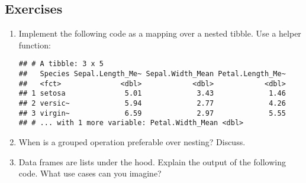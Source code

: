 \documentclass[]{book}
\newenvironment{Shaded}{\begin{snugshade}}{\end{snugshade}}
\newcommand{\ControlFlowTok}[1]{\textcolor[rgb]{0.13,0.29,0.53}{\textbf{#1}}}
\newcommand{\DataTypeTok}[1]{\textcolor[rgb]{0.13,0.29,0.53}{#1}}
\newcommand{\KeywordTok}[1]{\textcolor[rgb]{0.13,0.29,0.53}{\textbf{#1}}}
\newcommand{\NormalTok}[1]{#1}
\newcommand{\OperatorTok}[1]{\textcolor[rgb]{0.81,0.36,0.00}{\textbf{#1}}}
\newcommand{\StringTok}[1]{\textcolor[rgb]{0.31,0.60,0.02}{#1}}
\begin{document}
\hypertarget{exercises-15}{%
\subsection{Exercises}\label{exercises-15}}

\begin{enumerate}
\def\labelenumi{\arabic{enumi}.}
\item
  Implement the following code as a mapping over a nested tibble. Use a helper function:

\begin{Shaded}
\end{Shaded}

\begin{verbatim}
## # A tibble: 3 x 5
##   Species Sepal.Length_Me~ Sepal.Width_Mean Petal.Length_Me~
##   <fct>              <dbl>            <dbl>            <dbl>
## 1 setosa              5.01             3.43             1.46
## 2 versic~             5.94             2.77             4.26
## 3 virgin~             6.59             2.97             5.55
## # ... with 1 more variable: Petal.Width_Mean <dbl>
\end{verbatim}

\begin{Shaded}
\end{Shaded}
\item
  When is a grouped operation preferable over nesting? Discuss.
\item
  Data frames are lists under the hood. Explain the output of the following code. What use cases can you imagine?


\end{enumerate}
\end{document}
